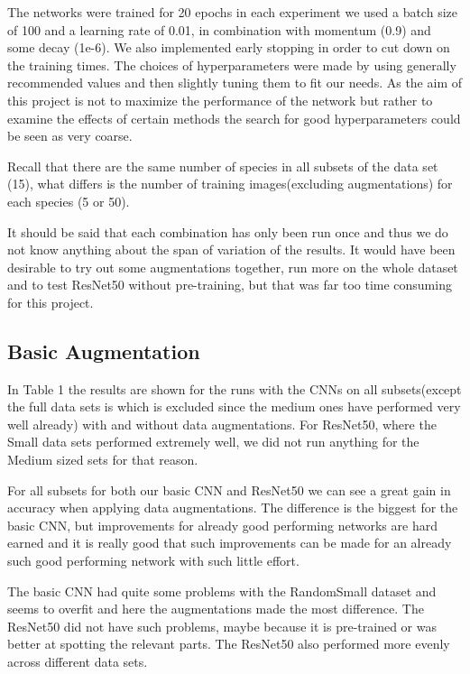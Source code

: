 \documentclass{article}
\begin{document}
The networks were trained for 20 epochs in each experiment we used a batch size of 100 and a learning rate of 0.01, in combination with momentum (0.9) and some decay (1e-6). We also implemented early stopping in order to cut down on the training times. The choices of hyperparameters were made by using generally recommended values and then slightly tuning them to fit our needs. As the aim of this project is not to maximize the performance of the network but rather to examine the effects of certain methods the search for good hyperparameters could be seen as very coarse.

Recall that there are the same number of species in all subsets of the data set (15), what differs is the number of training images(excluding augmentations) for each species (5 or 50).

It should be said that each combination has only been run once and thus we do not know anything about the span of variation of the results. It would have been desirable to try out some augmentations together, run more on the whole dataset and to test ResNet50 without pre-training, but that was far too time consuming for this project.

\subsection{Basic Augmentation}
In Table 1 the results are shown for the runs with the CNNs on all subsets(except the full data sets is which is excluded since the medium ones have performed very well already) with and without data augmentations. For ResNet50, where the Small data sets performed extremely well, we did not run anything for the Medium sized sets for that reason. 

For all subsets for both our basic CNN and ResNet50 we can see a great gain in accuracy when applying data augmentations. The difference is the biggest for the basic CNN, but improvements for already good performing networks are hard earned and it is really good that such improvements can be made for an already such good performing network with such little effort. 

The basic CNN had quite some problems with the RandomSmall dataset and seems to overfit and here the augmentations made the most difference. The ResNet50 did not have such problems, maybe because it is pre-trained or was better at spotting the relevant parts. The ResNet50 also performed more evenly across different data sets. 
\end{document}
